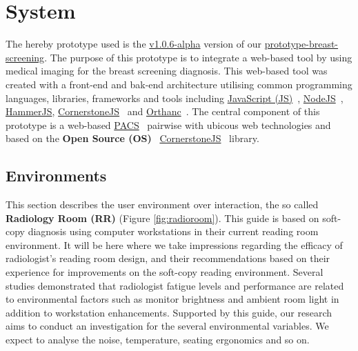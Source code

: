 \section{System}

The hereby prototype used is the \hyperlink{https://github.com/MIMBCD-UI/prototype-breast-screening/releases/tag/v1.0.6-alpha}{v1.0.6-alpha} version of our \hyperlink{https://github.com/MIMBCD-UI/prototype-breast-screening/}{prototype-breast-screening}. The purpose of this prototype is to integrate a web-based tool by using medical imaging for the breast screening diagnosis. This web-based tool was created with a front-end and bak-end architecture utilising common programming languages, libraries, frameworks and tools including \hyperlink{https://www.javascript.com/}{JavaScript (JS)}~\cite{flanagan2006javascript}, \hyperlink{https://nodejs.org/}{NodeJS}~\cite{wilson2018node}, \hyperlink{https://hammerjs.github.io/}{HammerJS}, \hyperlink{https://cornerstonejs.org/}{CornerstoneJS}~\cite{hostetter2018integration} and \hyperlink{https://www.orthanc-server.com/}{Orthanc}~\cite{Jodogne:ISBI2013}. The central component of this prototype is a web-based \hyperlink{https://www.sciencedirect.com/topics/medicine-and-dentistry/picture-archiving-and-communication-system}{PACS}~\cite{cooke2003picture} pairwise with ubicous web technologies and based on the \textbf{Open Source (OS)}~\cite{feller2002understanding} \hyperlink{https://cornerstonejs.org/}{CornerstoneJS}~\cite{hostetter2018integration} library.


\subsection{Environments}

This section describes the user environment over interaction, the so called \textbf{Radiology Room (RR)} (Figure \ref{fig:radioroom}). This guide is based on soft-copy diagnosis using computer workstations in their current reading room environment. It will be here where we take impressions regarding the efficacy of radiologist's reading room design, and their recommendations based on their experience for improvements on the soft-copy reading environment. Several studies demonstrated that radiologist fatigue levels and performance are related to environmental factors such as monitor brightness and ambient room light in addition to workstation enhancements. Supported by this guide, our research aims to conduct an investigation for the several environmental variables. We expect to analyse the noise, temperature, seating ergonomics and so on.

